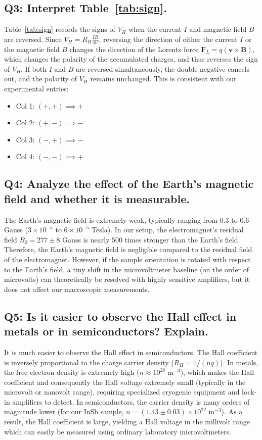 \documentclass[a4paper,11pt]{article}
\begin{document}
\subsection*{Q3: Interpret Table~\ref{tab:sign}.}
Table~\ref{tab:sign} records the signs of $V_H$ when the current $I$ and magnetic field $B$ are reversed. 
Since $V_H = R_H \frac{I B}{W}$, reversing the direction of either the current $I$ or the magnetic field $B$ changes the direction of the Lorentz force $\mathbf{F}_L = q(\mathbf{v} \times \mathbf{B})$, which changes the polarity of the accumulated charges, and thus reverses the sign of $V_H$. 
If both $I$ and $B$ are reversed simultaneously, the double negative cancels out, and the polarity of $V_H$ remains unchanged. This is consistent with our experimental entries:
\begin{itemize}
    \item Col 1: $(+, +) \implies +$
    \item Col 2: $(+, -) \implies -$
    \item Col 3: $(-, +) \implies -$
    \item Col 4: $(-, -) \implies +$
\end{itemize}

\subsection*{Q4: Analyze the effect of the Earth's magnetic field and whether it is measurable.}
The Earth's magnetic field is extremely weak, typically ranging from $0.3$ to $0.6$ Gauss ($3 \times 10^{-5}$ to $6 \times 10^{-5}$ Tesla). 
In our setup, the electromagnet's residual field $B_0 = 277 \pm 8$ Gauss is nearly 500 times stronger than the Earth's field. Therefore, the Earth's magnetic field is negligible compared to the residual field of the electromagnet. 
However, if the sample orientation is rotated with respect to the Earth's field, a tiny shift in the microvoltmeter baseline (on the order of microvolts) can theoretically be resolved with highly sensitive amplifiers, but it does not affect our macroscopic measurements.

\subsection*{Q5: Is it easier to observe the Hall effect in metals or in semiconductors? Explain.}
It is much easier to observe the Hall effect in semiconductors. 
The Hall coefficient is inversely proportional to the charge carrier density ($R_H = 1/(n q)$). 
In metals, the free electron density is extremely high ($n \approx 10^{28} \text{ m}^{-3}$), which makes the Hall coefficient and consequently the Hall voltage extremely small (typically in the microvolt or nanovolt range), requiring specialized cryogenic equipment and lock-in amplifiers to detect.
In semiconductors, the carrier density is many orders of magnitude lower (for our InSb sample, $n = (1.43 \pm 0.03) \times 10^{22} \text{ m}^{-3}$). As a result, the Hall coefficient is large, yielding a Hall voltage in the millivolt range which can easily be measured using ordinary laboratory microvoltmeters.
\end{document}

